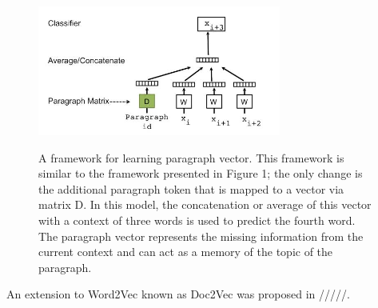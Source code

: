 \begin{figure}[h]
	\centering
	\includegraphics[width=8cm, height=5cm]{para}
	\caption[]{A framework for learning paragraph vector. This framework
		is similar to the framework presented in Figure 1; the only
		change is the additional paragraph token that is mapped to a vector
		via matrix D. In this model, the concatenation or average of
		this vector with a context of three words is used to predict the
		fourth word. The paragraph vector represents the missing information
		from the current context and can act as a memory of the
		topic of the paragraph.}
	\label{fig:doc2vec model}
\end{figure}

An extension to Word2Vec
known as Doc2Vec was proposed in /////. 



	